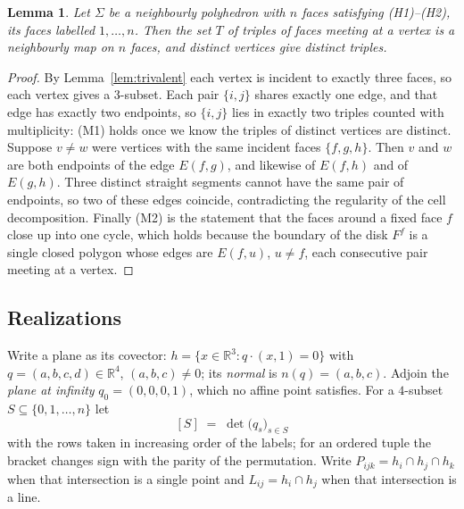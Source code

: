 \documentclass[11pt,reqno]{amsart}
\theoremstyle{plain}
\newtheorem{lemma}[theorem]{Lemma}
\theoremstyle{definition}
\newcommand{\RR}{\mathbb{R}}
\newcommand{\bra}[1]{[#1]}
\DeclareMathOperator{\dett}{det}
\begin{document}
\begin{lemma}\label{lem:inducedmap}
Let $\Sigma$ be a neighbourly polyhedron with $n$ faces satisfying \textup{(H1)}--\textup{(H2)}, its
faces labelled $1,\dots,n$. Then the set $T$ of triples of faces meeting at a vertex is a neighbourly
map on $n$ faces, and distinct vertices give distinct triples.
\end{lemma}

\begin{proof}
By Lemma~\ref{lem:trivalent} each vertex is incident to exactly three faces, so each vertex gives a
$3$-subset. Each pair $\{i,j\}$ shares exactly one edge, and that edge has exactly two endpoints, so
$\{i,j\}$ lies in exactly two triples counted with multiplicity: (M1) holds once we know the triples
of distinct vertices are distinct. Suppose $v\ne w$ were vertices with the same incident faces
$\{f,g,h\}$. Then $v$ and $w$ are both endpoints of the edge $E(f,g)$, and likewise of $E(f,h)$ and
of $E(g,h)$. Three distinct straight segments cannot have the same pair of endpoints, so two of these
edges coincide, contradicting the regularity of the cell decomposition. Finally (M2) is the statement
that the faces around a fixed face $f$ close up into one cycle, which holds because the boundary of
the disk $F^f$ is a single closed polygon whose edges are $E(f,u)$, $u\ne f$, each consecutive pair
meeting at a vertex.
\end{proof}

\subsection{Realizations}
Write a plane as its covector: $h=\{x\in\RR^3: q\cdot(x,1)=0\}$ with
$q=(a,b,c,d)\in\RR^4$, $(a,b,c)\ne 0$; its \emph{normal} is $n(q)=(a,b,c)$. Adjoin the
\emph{plane at infinity} $q_0=(0,0,0,1)$, which no affine point satisfies. For a $4$-subset
$S\subseteq\{0,1,\dots,n\}$ let
\[
  \bra{S} \;=\; \dett\big(q_s\big)_{s\in S}
\]
with the rows taken in increasing order of the labels; for an ordered tuple the bracket changes sign
with the parity of the permutation. Write $P_{ijk}=h_i\cap h_j\cap h_k$ when that intersection is a
single point and $L_{ij}=h_i\cap h_j$ when that intersection is a line.
\end{document}
